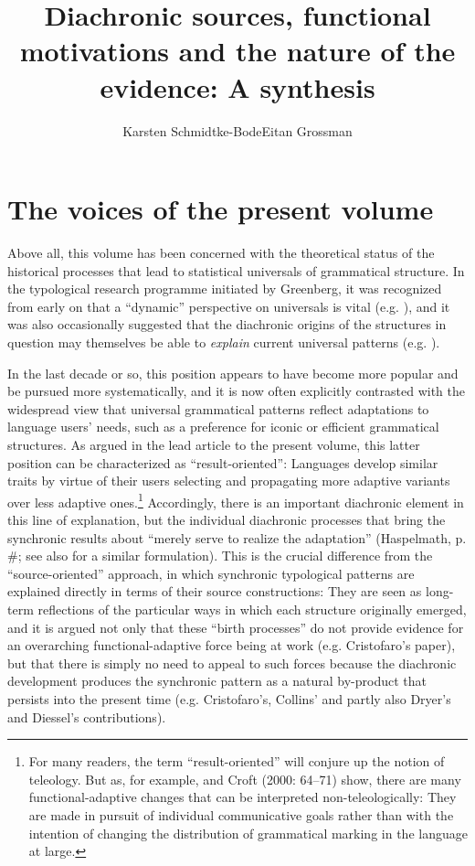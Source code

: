 \documentclass[output=paper]{langsci/langscibook}
\author{Karsten Schmidtke-Bode\affiliation{Leipzig University}\lastand Eitan Grossman\affiliation{Hebrew University of Jerusalem}}
\title{Diachronic sources, functional motivations and the nature of the evidence: A synthesis}
\begin{document}
\maketitle 
 
 

\section{The voices of the present volume}

Above all, this volume has been concerned with the theoretical status of the historical processes that lead to statistical universals of grammatical structure. In the typological research programme initiated by Greenberg, it was recognized from early on that a “dynamic” perspective on universals is vital (e.g. \citealt{Greenberg1969}), and it was also occasionally suggested that the diachronic origins of the structures in question may themselves be able to \textit{explain} current universal patterns (e.g. \citealt{Givón1975,Greenberg1978}). 

In the last decade or so, this position appears to have become more popular and be pursued more systematically, and it is now often explicitly contrasted with the widespread view that universal grammatical patterns reflect adaptations to language users’ needs, such as a preference for iconic or efficient grammatical structures. As argued in the lead article to the present volume, this latter position can be characterized as “result-oriented”: Languages develop similar traits by virtue of their users selecting and propagating more adaptive variants over less adaptive ones.\footnote{For many readers, the term “result-oriented” will conjure up the notion of teleology. But as, for example, \citet{Keller1994} and Croft (2000: 64–71) show, there are many functional-adaptive changes that can be interpreted non-teleologically: They are made in pursuit of individual communicative goals rather than with the intention of changing the distribution of grammatical marking in the language at large.} Accordingly, there is an important diachronic element in this line of explanation, but the individual diachronic processes that bring the synchronic results about “merely serve to realize the adaptation” (Haspelmath, p. \#; see also \citet[266]{Hawkins2004} for a similar formulation). This is the crucial difference from the “source-oriented” approach, in which synchronic typological patterns are explained directly in terms of their source constructions: They are seen as long-term reflections of the particular ways in which each structure originally emerged, and it is argued not only that these “birth processes” do not provide evidence for an overarching functional-adaptive force being at work (e.g. Cristofaro’s paper), but that there is simply no need to appeal to such forces because the diachronic development produces the synchronic pattern as a natural by-product that persists into the present time (e.g. Cristofaro’s, Collins’ and partly also Dryer’s and Diessel’s contributions). 
\end{document}
